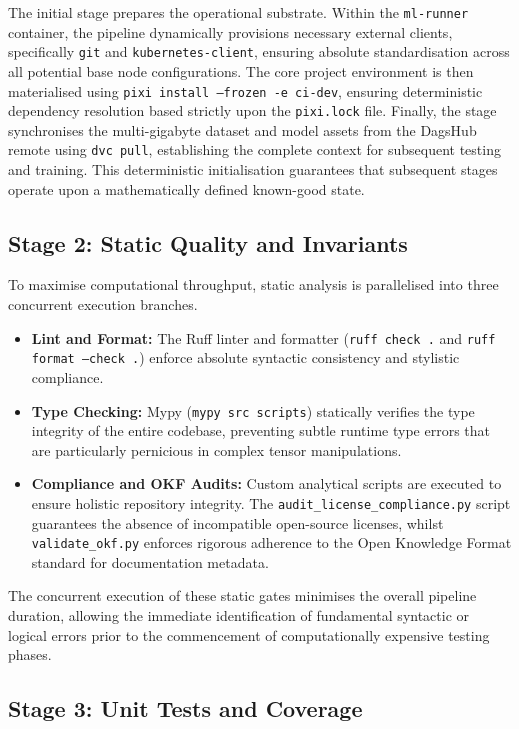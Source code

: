 The initial stage prepares the operational substrate. Within the \texttt{ml-runner} container, the pipeline dynamically provisions necessary external clients, specifically \texttt{git} and \texttt{kubernetes-client}, ensuring absolute standardisation across all potential base node configurations. The core project environment is then materialised using \texttt{pixi install --frozen -e ci-dev}, ensuring deterministic dependency resolution based strictly upon the \texttt{pixi.lock} file. Finally, the stage synchronises the multi-gigabyte dataset and model assets from the DagsHub remote using \texttt{dvc pull}, establishing the complete context for subsequent testing and training. This deterministic initialisation guarantees that subsequent stages operate upon a mathematically defined known-good state.

\subsection{Stage 2: Static Quality and Invariants}

To maximise computational throughput, static analysis is parallelised into three concurrent execution branches.
\begin{itemize}
    \item \textbf{Lint and Format:} The Ruff linter and formatter (\texttt{ruff check .} and \texttt{ruff format --check .}) enforce absolute syntactic consistency and stylistic compliance.
    \item \textbf{Type Checking:} Mypy (\texttt{mypy src scripts}) statically verifies the type integrity of the entire codebase, preventing subtle runtime type errors that are particularly pernicious in complex tensor manipulations.
    \item \textbf{Compliance and OKF Audits:} Custom analytical scripts are executed to ensure holistic repository integrity. The \texttt{audit\_license\_compliance.py} script guarantees the absence of incompatible open-source licenses, whilst \texttt{validate\_okf.py} enforces rigorous adherence to the Open Knowledge Format standard for documentation metadata.
\end{itemize}
The concurrent execution of these static gates minimises the overall pipeline duration, allowing the immediate identification of fundamental syntactic or logical errors prior to the commencement of computationally expensive testing phases.

\subsection{Stage 3: Unit Tests and Coverage}

